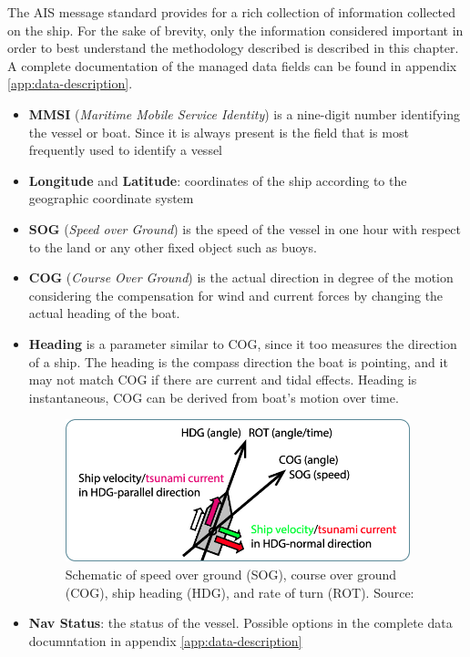     The AIS message standard provides for a rich collection of information collected on the ship. For the sake of brevity, only the information considered important in order to best understand the methodology described is described in this chapter. A complete documentation of the managed data fields can be found in appendix \ref{app:data-description}.
    
    
    \begin{itemize}
    \item \textbf{MMSI} (\textit{Maritime Mobile Service Identity}) is a nine-digit number identifying the vessel or boat. Since it is always present is the field that is most frequently used to identify a vessel
    \item \textbf{Longitude} and \textbf{Latitude}: coordinates of the ship according to the geographic coordinate system
    \item \textbf{SOG} (\textit{Speed over Ground}) is the speed of the vessel in one hour with respect to the land or any other fixed object such as buoys.
    \item \textbf{COG} (\textit{Course Over Ground}) is the actual direction in degree of the motion considering the compensation for wind and current forces by changing the actual heading of the boat.
    \item \textbf{Heading} is a parameter similar to COG, since it too measures the direction of a ship. The heading is the compass direction the boat is pointing, and it may not match COG if there are current and tidal effects. Heading is instantaneous, COG can be derived from boat's motion over time.
    
        \begin{figure}[H]
        \centering
            \includegraphics[width=10cm]{Images/appendices/cog-sog.png}
        \caption{Schematic of speed over ground (SOG), course over ground (COG), ship heading (HDG), and rate of turn (ROT). Source: \cite{Inazu2020}}
        \end{figure}
        
    \item \textbf{Nav Status}: the status of the vessel. Possible options in the complete data documntation in appendix \ref{app:data-description}
    \end{itemize}
    
